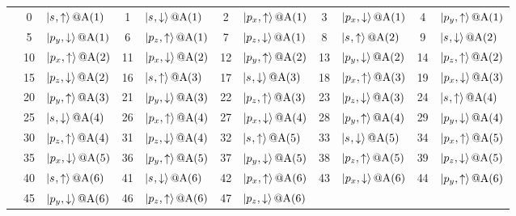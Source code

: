 \documentclass[fleqn,10pt,landscape]{jsarticle}
\begin{document}
\begin{longtable}[l]{c|cl|cl|cl|cl|cl}
 & 0 & $\ket{s_{},\uparrow}@{\rm A}(1)$ & 1 & $\ket{s_{},\downarrow}@{\rm A}(1)$ & 2 & $\ket{p_{x},\uparrow}@{\rm A}(1)$ & 3 & $\ket{p_{x},\downarrow}@{\rm A}(1)$ & 4 & $\ket{p_{y},\uparrow}@{\rm A}(1)$ \\
& 5 & $\ket{p_{y},\downarrow}@{\rm A}(1)$ & 6 & $\ket{p_{z},\uparrow}@{\rm A}(1)$ & 7 & $\ket{p_{z},\downarrow}@{\rm A}(1)$ & 8 & $\ket{s_{},\uparrow}@{\rm A}(2)$ & 9 & $\ket{s_{},\downarrow}@{\rm A}(2)$ \\
& 10 & $\ket{p_{x},\uparrow}@{\rm A}(2)$ & 11 & $\ket{p_{x},\downarrow}@{\rm A}(2)$ & 12 & $\ket{p_{y},\uparrow}@{\rm A}(2)$ & 13 & $\ket{p_{y},\downarrow}@{\rm A}(2)$ & 14 & $\ket{p_{z},\uparrow}@{\rm A}(2)$ \\
& 15 & $\ket{p_{z},\downarrow}@{\rm A}(2)$ & 16 & $\ket{s_{},\uparrow}@{\rm A}(3)$ & 17 & $\ket{s_{},\downarrow}@{\rm A}(3)$ & 18 & $\ket{p_{x},\uparrow}@{\rm A}(3)$ & 19 & $\ket{p_{x},\downarrow}@{\rm A}(3)$ \\
& 20 & $\ket{p_{y},\uparrow}@{\rm A}(3)$ & 21 & $\ket{p_{y},\downarrow}@{\rm A}(3)$ & 22 & $\ket{p_{z},\uparrow}@{\rm A}(3)$ & 23 & $\ket{p_{z},\downarrow}@{\rm A}(3)$ & 24 & $\ket{s_{},\uparrow}@{\rm A}(4)$ \\
& 25 & $\ket{s_{},\downarrow}@{\rm A}(4)$ & 26 & $\ket{p_{x},\uparrow}@{\rm A}(4)$ & 27 & $\ket{p_{x},\downarrow}@{\rm A}(4)$ & 28 & $\ket{p_{y},\uparrow}@{\rm A}(4)$ & 29 & $\ket{p_{y},\downarrow}@{\rm A}(4)$ \\
& 30 & $\ket{p_{z},\uparrow}@{\rm A}(4)$ & 31 & $\ket{p_{z},\downarrow}@{\rm A}(4)$ & 32 & $\ket{s_{},\uparrow}@{\rm A}(5)$ & 33 & $\ket{s_{},\downarrow}@{\rm A}(5)$ & 34 & $\ket{p_{x},\uparrow}@{\rm A}(5)$ \\
& 35 & $\ket{p_{x},\downarrow}@{\rm A}(5)$ & 36 & $\ket{p_{y},\uparrow}@{\rm A}(5)$ & 37 & $\ket{p_{y},\downarrow}@{\rm A}(5)$ & 38 & $\ket{p_{z},\uparrow}@{\rm A}(5)$ & 39 & $\ket{p_{z},\downarrow}@{\rm A}(5)$ \\
& 40 & $\ket{s_{},\uparrow}@{\rm A}(6)$ & 41 & $\ket{s_{},\downarrow}@{\rm A}(6)$ & 42 & $\ket{p_{x},\uparrow}@{\rm A}(6)$ & 43 & $\ket{p_{x},\downarrow}@{\rm A}(6)$ & 44 & $\ket{p_{y},\uparrow}@{\rm A}(6)$ \\
& 45 & $\ket{p_{y},\downarrow}@{\rm A}(6)$ & 46 & $\ket{p_{z},\uparrow}@{\rm A}(6)$ & 47 & $\ket{p_{z},\downarrow}@{\rm A}(6)$ &  &  &  &  \\
\end{longtable}
\renewcommand{\arraystretch}{1.6}
\end{document}
